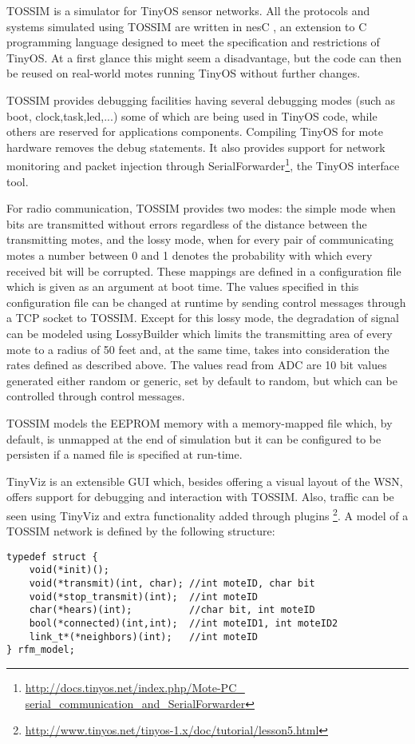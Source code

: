 \label{subsec:tossim}
TOSSIM\cite{tossim} is a simulator for TinyOS sensor networks.
All the protocols and systems simulated using TOSSIM are written in nesC \cite{nesC},
an extension to C programming language designed to meet the specification and 
restrictions of TinyOS. At a first glance this might seem a disadvantage, but 
the code can then be reused on real-world motes running TinyOS
without further changes.

TOSSIM provides debugging facilities having several debugging modes 
(such as boot, clock,task,led,...) some of which are being used in TinyOS code, 
while others are reserved for applications components. Compiling TinyOS for mote
hardware removes the debug statements.
It also provides support for network monitoring and packet injection
through SerialForwarder\footnote{\url{http://docs.tinyos.net/index.php/Mote-PC_
serial_communication_and_SerialForwarder}}, the TinyOS interface tool.

For radio communication, TOSSIM provides two modes: the simple mode when bits
are transmitted without errors regardless of the distance between the transmitting
motes, and the lossy mode, when for every pair of communicating motes a number between 0 and 1 
denotes the probability with which every received bit will be corrupted. These 
mappings are defined in a configuration file which is given as an argument at boot
time. The values specified in this configuration file can be changed at runtime
by sending control messages through a TCP socket to TOSSIM.
 Except for this lossy mode, the degradation of signal can be modeled using
LossyBuilder which limits the transmitting area of every mote to a radius of 50
 feet and, at the same time, takes into consideration the rates defined as 
described above.
The values read from ADC are 10 bit values generated either random or generic, set
by default to random, but which can be controlled through control messages.

TOSSIM models the EEPROM memory with a memory-mapped file which, by default, is
unmapped at the end of simulation but it can be configured to be persisten if a
named file is specified at run-time.

TinyViz is an extensible GUI which, besides offering a visual layout of the 
WSN, offers support for debugging and interaction with TOSSIM. Also, traffic can
be seen using TinyViz and extra functionality added through plugins
\footnote{\url{http://www.tinyos.net/tinyos-1.x/doc/tutorial/lesson5.html}}.
A model of a TOSSIM network is defined by the following structure:
\lstset{numbers=none,captionpos=b,frame=single,language=C,caption=Structure for defining a network in TOSSIM,label=lst:tossimnet}
\begin{lstlisting}
typedef struct {
    void(*init)();
    void(*transmit)(int, char); //int moteID, char bit
    void(*stop_transmit)(int);  //int moteID
    char(*hears)(int);          //char bit, int moteID
    bool(*connected)(int,int);  //int moteID1, int moteID2
    link_t*(*neighbors)(int);   //int moteID
} rfm_model;
\end{lstlisting}


